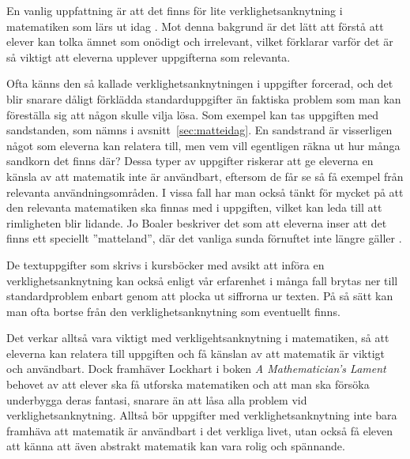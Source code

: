 \textcolor{lila}{En vanlig uppfattning är att det finns för lite verklighetsanknytning i matematiken som lärs ut idag \cite{TheElephant}. Mot denna bakgrund är det lätt att förstå att elever kan tolka ämnet som onödigt och irrelevant, vilket förklarar varför det är så viktigt att eleverna upplever uppgifterna som relevanta.}

\textcolor{lila}{Ofta känns den så kallade verklighetsanknytningen i uppgifter forcerad, och det blir snarare dåligt förklädda standarduppgifter än faktiska problem som man kan föreställa sig att någon skulle vilja lösa. Som exempel kan tas uppgiften med sandstanden, som nämns i avsnitt~\ref{sec:matteidag}. En sandstrand är visserligen något som eleverna kan relatera till, men vem vill egentligen räkna ut hur många sandkorn det finns där?  Dessa typer av uppgifter riskerar att ge eleverna en känsla av att matematik inte är användbart, eftersom de får se så få exempel från relevanta användningsområden.
I vissa fall har man också tänkt för mycket på att den relevanta matematiken ska finnas med i uppgiften, vilket kan leda till att rimligheten blir lidande. Jo Boaler beskriver det som att eleverna inser att det finns ett speciellt ''matteland'', där det vanliga sunda förnuftet inte längre gäller \cite{TheElephant}.}
    
\textcolor{lila}{De textuppgifter som skrivs  i kursböcker med avsikt att införa en verklighetsanknytning kan också enligt vår erfarenhet i många fall brytas ner till standardproblem enbart genom att plocka ut siffrorna ur texten. På så sätt kan man ofta bortse från den verklighetsanknytning som eventuellt finns.}

\textcolor{lila}{Det verkar alltså vara viktigt med verkligehtsanknytning i matematiken, så att eleverna kan relatera till uppgiften och få känslan av att matematik är viktigt och användbart.} \textcolor{Mahogany}{Dock framhäver Lockhart i boken \textsl{A Mathematician's Lament} \cite{lockhart} behovet av att elever ska få utforska matematiken och att man ska försöka underbygga deras fantasi, snarare än att låsa alla problem vid verklighetsanknytning. Alltså bör uppgifter med verklighetsanknytning inte bara framhäva att matematik är användbart i det verkliga livet, utan också få eleven att känna att även abstrakt matematik kan vara rolig och spännande.}